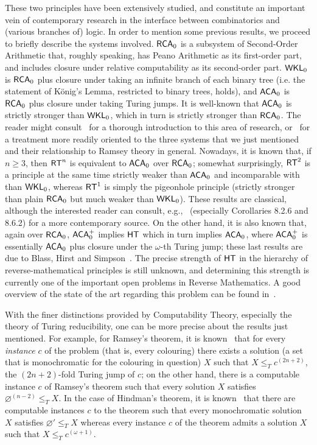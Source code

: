 \documentclass[10pt,a4paper]{amsart}
\newcommand{\rt}{\mathnormal{\mathsf{RT}}}
\newcommand{\hind}{\mathnormal{\mathsf{HT}}}
\newcommand{\rca}{\mathnormal{\mathsf{RCA}}_0}
\newcommand{\aca}{\mathnormal{\mathsf{ACA}}_0}
\newcommand{\wkl}{\mathnormal{\mathsf{WKL}}_0}
\newcommand{\acaplus}{\mathnormal{\mathsf{ACA}}_0^+}
\theoremstyle{definition}
\begin{document}
These two principles have been extensively studied, and constitute an important vein of contemporary research in the interface between combinatorics and (various branches of) logic. In order to mention some previous results, we proceed to briefly describe the systems involved. $\rca$ is a subsystem of Second-Order Arithmetic that, roughly speaking, has Peano Arithmetic as its first-order part, and includes closure under relative computability as its second-order part. $\wkl$ is $\rca$ plus closure under taking an infinite branch of each binary tree (i.e. the statement of K\"onig's Lemma, restricted to binary trees, holds), and $\aca$ is $\rca$ plus closure under taking Turing jumps. It is well-known that $\aca$ is strictly stronger than $\wkl$, which in turn is strictly stronger than $\rca$. The reader might consult~\cite{simpson-subsystems} for a thorough introduction to this area of research, or~\cite{hirschfeldt} for a treatment more readily oriented to the three systems that we just mentioned and their relationship to Ramsey theory in general. Nowadays, it is known that, if $n\geq 3$, then $\rt^n$ is equivalent to $\aca$ over $\rca$; somewhat surprisingly, $\rt^2$ is a principle at the same time strictly weaker than $\aca$ and incomparable with than $\wkl$, whereas $\rt^1$ is simply the pigeonhole principle (strictly stronger than plain $\rca$ but much weaker than $\wkl$). These results are classical, although the interested reader can consult, e.g.,~\cite{dzhafarov-mummert-textbook} (especially Corollaries 8.2.6 and 8.6.2) for a more contemporary source. On the other hand, it is also known that, again over $\rca$, $\acaplus$ implies $\hind$ which in turn implies $\aca$, where $\acaplus$ is essentially $\aca$ plus closure under the $\omega$-th Turing jump; these last results are due to Blass, Hirst and Simpson~\cite{blass-hirst-simpson}. The precise strength of $\hind$ in the hierarchy of reverse-mathematical principles is still unknown, and determining this strength is currently one of the important open problems in Reverse Mathematics. A good overview of the state of the art regarding this problem can be found in~\cite{carlucci-overview}.

With the finer distinctions provided by Computability Theory, especially the theory of Turing reducibility, one can be more precise about the results just mentioned. For example, for Ramsey's theorem, it is known~\cite{jockusch} that for every {\it instance} $c$ of the problem (that is, every colouring) there exists a solution (a set that is monochromatic for the colouring in question) $X$ such that $X\leq_T c^{(2n+2)}$, the $(2n+2)$-fold Turing jump of $c$; on the other hand, there is a computable instance $c$ of Ramsey's theorem such that every solution $X$ satisfies $\varnothing^{(n-2)}\leq_T X$. In the case of Hindman's theorem, it is known~\cite{blass-hirst-simpson} that there are computable instances $c$ to the theorem such that every monochromatic solution $X$ satisfies $\varnothing'\leq_T X$ whereas every instance $c$ of the theorem admits a solution $X$ such that $X\leq_T c^{(\omega+1)}$.
\end{document}

